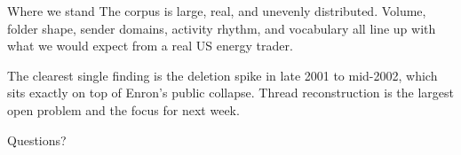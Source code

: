 \documentclass[aspectratio=169,14pt]{beamer}
\begin{document}
\begin{frame}{Where we stand}
  The corpus is large, real, and unevenly distributed. Volume, folder
  shape, sender domains, activity rhythm, and vocabulary all line up
  with what we would expect from a real US energy trader.

  \medskip
  The clearest single finding is the deletion spike in late 2001 to
  mid-2002, which sits exactly on top of Enron's public collapse.
  Thread reconstruction is the largest open problem and the focus for
  next week.

  \medskip
  \begin{center}\large Questions?\end{center}
\end{frame}
\end{document}
